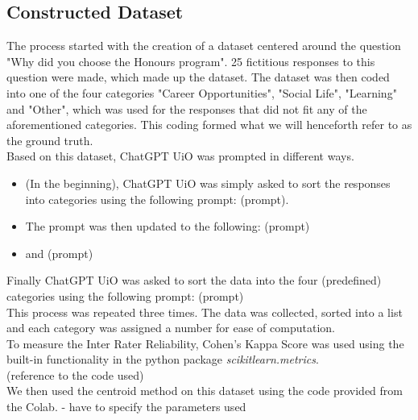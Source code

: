 \subsection{Constructed Dataset}
\begin{flushleft}
The process started with the creation of a dataset centered around the question "Why did you choose the Honours program". 25 fictitious responses to this question were made, which made up the dataset. 
The dataset was then coded into one of the four categories "Career Opportunities", "Social Life", "Learning" and "Other", which was used for the responses that did not fit any of the aforementioned categories.
This coding formed what we will henceforth refer to as the ground truth.\\
Based on this dataset, ChatGPT UiO was prompted in different ways. \\
\begin{itemize}
    \item (In the beginning), ChatGPT UiO was simply asked to sort the responses into categories using the following prompt: (prompt).
    \item The prompt was then updated to the following: (prompt)\\
    \item and (prompt)\\
\end{itemize}
Finally ChatGPT UiO was asked to sort the data into the four (predefined) categories using the following prompt: (prompt)\\
This process was repeated three times. The data was collected, sorted into a list and each category was assigned
a number for ease of computation.\\[10pt]

To measure the Inter Rater Reliability, Cohen's Kappa Score was used using the built-in functionality in the python package \textit{scikitlearn.metrics}.\\
(reference to the code used)\\[10pt]

We then used the centroid method on this dataset using the code provided from the Colab. - have to specify the parameters used


\end{flushleft}
